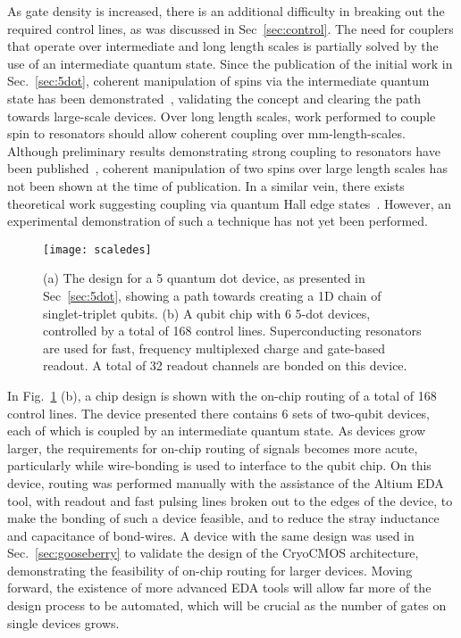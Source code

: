 As gate density is increased, there is an additional difficulty in breaking out the required control lines, as was discussed in Sec~\ref{sec:control}. The need for
couplers that operate over intermediate and long length scales is partially solved by the use of an intermediate quantum state. Since the publication of the initial work in
Sec.~\ref{sec:5dot}, coherent manipulation of spins via the intermediate quantum state has been demonstrated~\cite{s41467-019-09194-x}, validating the concept
and clearing the path towards large-scale devices. Over long length scales, work performed to couple spin to resonators should allow coherent coupling over
\si{\milli\meter}-length-scales. Although preliminary results demonstrating strong coupling to resonators have been published~\cite{nature11559,2019arXiv190500776B},
coherent manipulation of two spins over large length scales has not been shown at the time of publication. In a similar vein, there exists theoretical work suggesting
coupling via quantum Hall edge states~\cite{dohertyqhe}. However, an experimental demonstration of such a technique has not yet been performed.

\begin{figure}
    \texttt{[image: scaledes]}
    \caption[Scaleable qubit designs]{\label{fig:scaledes} (a) The design for a 5 quantum dot device, as presented in Sec~\ref{sec:5dot}, showing a path towards creating a 1D
    chain of singlet-triplet qubits. (b) A qubit chip with 6 5-dot devices, controlled by a total of 168 control lines. Superconducting resonators are used for fast,
    frequency multiplexed charge and gate-based readout. A total of 32 readout channels are bonded on this device.}
\end{figure}

In Fig.~\ref{fig:scaledes} (b), a chip design is shown with the on-chip routing of a total of 168 control lines. The device presented there contains 6 sets of two-qubit devices,
each of which is coupled by an intermediate quantum state. As devices grow larger, the requirements for on-chip routing of signals becomes more acute, particularly
while wire-bonding is used to interface to the qubit chip. On this device, routing was performed manually with the assistance of the Altium EDA tool, with readout and
fast pulsing lines broken out to the edges of the device, to make the bonding of such a device feasible, and to reduce the stray inductance and capacitance of bond-wires.
A device with the same design was used in Sec.~\ref{sec:gooseberry} to validate the design of the CryoCMOS architecture, demonstrating the feasibility of on-chip routing
for larger devices. Moving forward, the existence of more advanced EDA tools will allow far more of the design process to be automated, which will be crucial as the
number of gates on single devices grows.

